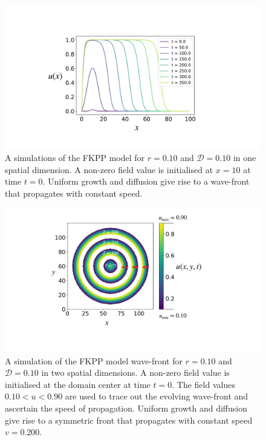 \begin{figure}
    \centering
    \includegraphics[scale=0.25]{chapter7/figures/figure1xy.pdf}
    \caption{A simulations of the FKPP model for $r=0.10$ and $\mathcal{D}=0.10$ in one spatial dimension. A non-zero field value is initialised at $x=10$ at time $t=0$. Uniform growth and diffusion give rise to a wave-front that propagates with constant speed.}
    \label{fig:fkpp-expo1D}
\end{figure}


\begin{figure}
    \centering
    \includegraphics[scale=0.25]{chapter7/figures/figure2x.pdf}
    \caption{A simulation of the FKPP model wave-front for $r=0.10$ and $\mathcal{D}=0.10$ in two spatial dimensions. A non-zero field value is initialised at the domain center at time $t=0$. The field values $0.10 < u < 0.90$ are used to trace out the evolving wave-front and ascertain the speed of propagation. Uniform growth and diffusion give rise to a symmetric front that propagates with constant speed $v=0.200$.}
    \label{fig:fkpp-expo2D}
\end{figure}


